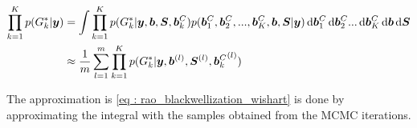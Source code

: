 \begin{equation}
\label{eq : rao_blackwellization_wishart}
\begin{split}
\prod_{k=1}^{K} p(G_k^*|\boldsymbol{y}) & = \int \prod_{k=1}^{K} p(G_k^*| \boldsymbol{y}, \boldsymbol{b}, \boldsymbol{S}, \boldsymbol{b}_k^C) p(\boldsymbol{b}_1^C, \boldsymbol{b}_2^C,..., \boldsymbol{b}_K^C,\boldsymbol{b}, \boldsymbol{S}|\boldsymbol{y}) 
\mathop{}\!\mathrm{d}{\boldsymbol{b}_1^C} \mathop{}\!\mathrm{d}{\boldsymbol{b}_2^C} ... \mathop{}\!\mathrm{d}{\boldsymbol{b}_K^C} \mathop{}\!\mathrm{d}{\boldsymbol{b}} \mathop{}\!\mathrm{d}{\boldsymbol{S}}\\
& \approx \frac 1 m \sum_{l=1}^m \prod_{k=1}^{K} p(G_k^*| \boldsymbol{y}, \boldsymbol{b}^{(l)}, \boldsymbol{S}^{(l)}, {\boldsymbol{b}_k^C}^{(l)})
\end{split}
\end{equation}

The approximation is \ref{eq : rao_blackwellization_wishart} is done by approximating the integral with the samples obtained from the MCMC iterations.